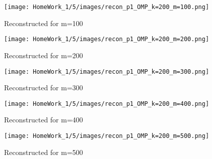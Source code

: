 \documentclass{article}
\begin{document}
\begin{figure}[h!]
    \centering
    \begin{minipage}{0.1\textwidth}
        \texttt{[image: HomeWork\_1/5/images/recon\_p1\_OMP\_k=200\_m=100.png]}
        \caption{Reconstructed for m=100}
    \end{minipage}
    \hspace{0.5cm}
    \begin{minipage}{0.1\textwidth}
        \centering
        \texttt{[image: HomeWork\_1/5/images/recon\_p1\_OMP\_k=200\_m=200.png]}
        \caption{Reconstructed for m=200}
    \end{minipage}
    \hspace{0.5cm}
    \begin{minipage}{0.1\textwidth}
        \centering
        \texttt{[image: HomeWork\_1/5/images/recon\_p1\_OMP\_k=200\_m=300.png]}
        \caption{Reconstructed for m=300}
    \end{minipage}
    \hspace{0.5cm}
    \begin{minipage}{0.1\textwidth}
        \centering
        \texttt{[image: HomeWork\_1/5/images/recon\_p1\_OMP\_k=200\_m=400.png]}
        \caption{Reconstructed for m=400}
    \end{minipage}
    \hspace{0.5cm}
    \begin{minipage}{0.1\textwidth}
        \centering
        \texttt{[image: HomeWork\_1/5/images/recon\_p1\_OMP\_k=200\_m=500.png]}
        \caption{Reconstructed for m=500}
    \end{minipage}

    \vspace{1cm} %


\end{figure}
\end{document}
